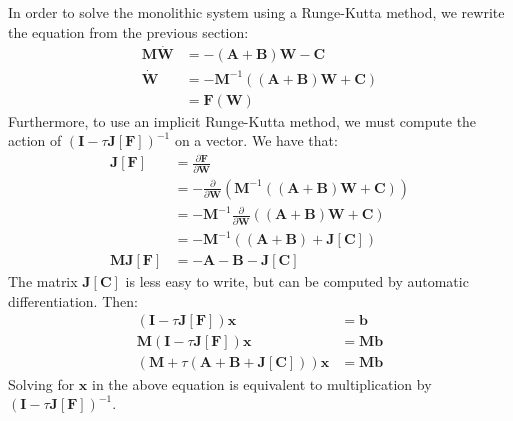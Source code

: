 \documentclass{article}
\newcommand{\bvec}[1]{\boldsymbol{#1}}
\newcommand{\bmat}[1]{\boldsymbol{#1}}
\newcommand{\brmat}[1]{\mathbf{#1}}
\begin{document}
In order to solve the monolithic system using a Runge-Kutta method,
we rewrite the equation from the previous section:
\begin{align*}
    \bmat{M} \dot{\bvec{W}}
        & = -(\bmat{A} + \bmat{B}) \bvec{W}
            - \bvec{C} \\
    \dot{\bvec{W}}
        & = -\bmat{M}^{-1} ((\bmat{A} + \bmat{B}) \bvec{W}
            + \bvec{C}) \\
        & = \bvec{F}(\bvec{W})
\end{align*}
\noindent Furthermore, to use an implicit Runge-Kutta method,
we must compute the action of $(\brmat{I} - \tau \brmat{J}[\bvec{F}])^{-1}$
on a vector. We have that:
\begin{align*}
    \brmat{J}[\bvec{F}]
        & = \frac{\partial \bvec{F}}{\partial \bvec{W}} \\
        & = -\frac{\partial}{\partial \bvec{W}}
            (\bmat{M}^{-1} ((\bmat{A} + \bmat{B}) \bvec{W} + \bvec{C})) \\
        & = -\bmat{M}^{-1} \frac{\partial}{\partial \bvec{W}}
            ((\bmat{A} + \bmat{B}) \bvec{W} + \bvec{C}) \\
        & = -\bmat{M}^{-1} ((\bmat{A} + \bmat{B}) + \brmat{J}[\bvec{C}]) \\
    \bmat{M} \brmat{J}[\bvec{F}]
        & = -\bmat{A} - \bmat{B} - \brmat{J}[\bvec{C}]
\end{align*}
\noindent The matrix $\brmat{J}[\bvec{C}]$ is less easy to write,
but can be computed by automatic differentiation.
Then:
\begin{align*}
    (\brmat{I} - \tau \brmat{J}[\bvec{F}]) \bvec{x} & = \bvec{b} \\
    \bmat{M} (\brmat{I} - \tau \brmat{J}[\bvec{F}]) \bvec{x} & = \bmat{M} \bvec{b} \\
    (\bmat{M} + \tau (\bmat{A} + \bmat{B} + \brmat{J}[\bvec{C}])) \bvec{x} & = \bmat{M} \bvec{b}
\end{align*}
\noindent Solving for $\bvec{x}$ in the above equation is equivalent to
multiplication by $(\brmat{I} - \tau \brmat{J}[\bvec{F}])^{-1}$.
\end{document}
